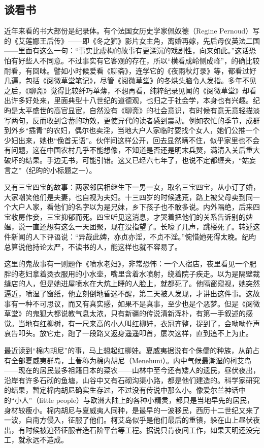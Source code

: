 \subsection{谈看书}


\par 近年来看的书大部份是纪录体。有个法国女历史学家佩奴德（Regine Pernoud）写的《艾莲娜王后传》——即《冬之狮》影片女主角，离婚再嫁，先后母仪英法二国——里面有这么一句：“事实比虚构的故事有更深沉的戏剧性，向来如此。”这话恐怕有好些人不同意。不过事实有它客观的存在，所以“横看成岭侧成峰”，的确比较耐看，有回味。譬如小时候爱看《聊斋》，连学它的《夜雨秋灯录》等，都看过好几遍，包括《阅微草堂笔记》，尽管《阅微草堂》的冬烘头脑令人发指。多年不见之后，《聊斋》觉得比较纤巧单薄，不想再看，纯粹纪录见闻的《阅微草堂》却看出许多好处来，里面典型十八世纪的道德观，也归之于社会学，本身也有兴趣。纪昀是太平盛世的高官显宦，自然没有《聊斋》的社会意识，有时候有意无意轻描淡写两句，反而收到含蓄的功效，更使异代的读者感到震动。例如农忙的季节，成群到外乡“插青”的农妇，偶尔也卖淫，当地大户人家临时要找个女人，她们公推一个少妇出来，她也“俛首无语”。伙伴间这样公开，回去显然瞒不住，似乎家里也不会有问题，这在中国农村几乎不能想像，不知道是否还是明末兵燹，满清入关后重大破坏的结果。手边无书，可能引错。这又已经六七年了，也说不定都缠夹，“姑妄言之”（纪昀的小标题之一）。
\par 又有三宝四宝的故事：两家邻居相继生下一男一女，取名三宝四宝，从小订了婚，大家嘲笑他们是夫妻，也自视为夫妇。十三四岁的时候逃荒，路上被父母卖到同一个大户人家，看他们的名字以为是兄妹，乡下孩子也不敢多说。内外隔绝，后来四宝收房作妾，三宝抑郁而死。四宝听见这消息，才哭着把他们的关系告诉别的婢媪，说一直还想有这么一天团聚，现在没指望了。长嚎了几声，跳楼死了。转述这件新闻的人下评语说：“异哉此婢，亦贞亦淫，不贞不淫。”惋惜她死得太晚。纪昀总算说他持论太严，不读书的人，能这样也就不容易了。
\par 这里的鬼故事有一则题作《喷水老妇》，非常恐怖：一个人宿店，夜里看见一个肥胖的老妇拿着烫衣服用的小水壶，嘴里含着水喷射，绕着院子疾走。以为是隔壁裁缝店的人，但是她进屋喷水在大炕上睡的人脸上，就都死了。他隔窗窥视，她突然逼近，喷湿了窗纸，他立刻倒地昏迷不醒，第二天被人发现，才讲出这件事。这故事有一种不可思议，而又有真实感，如果不是真事，至少也是个恶梦。但是《阅微草堂》的鬼狐大都说教气息太浓，只有新疆的传说清新浑朴，有第一手叙述的感觉。当地有红柳树，有一尺来高的小人叫红柳娃，衣冠齐整，捉到了，会呦呦作声哀告叩头。放它走，跑了一段路又返身遥遥叩首，屡次这样，直到追不上为止。
\par 最近读到“棉内胡尼”的事，马上想起红柳娃。夏威夷据说有个侏儒的种族，从前占有全部夏威夷群岛，土著称为棉内胡尼（Menehuni）。内中气候最潮湿的柯艾岛——现在的居民最多祖籍日本的菜农——山林中至今还有矮人的遗民，昼伏夜出，沿岸有许多石砌的鱼塘，山谷中又有石砌沟渠小路，都是他们建造的。科学家研究的结果，暂定棉内胡尼确实生存过，不过没有传说中那么小。像爱尔兰神话中的“小人”（little people）与欧洲大陆上的各种小精灵，都只是当地早先的居民，身材较瘦小。棉内胡尼与夏威夷人同种，是最早的一波移民，西历十二世纪又来了一波，自南方侵入，征服了他们。柯艾岛似乎是他们最后的重镇，躲在山上昼伏夜出，有时候被迫替征服者造石阶平台等工程。据说只肯夜间工作，如果天明还没完工，就永远不造成。
